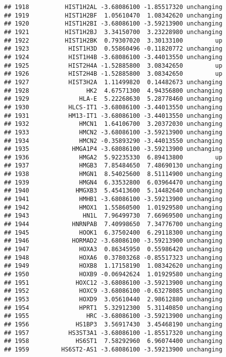 \documentclass[]{article}
\begin{document}
\begin{verbatim}
## 1918          HIST1H2AL -3.68086100 -1.85517320 unchanging
## 1919          HIST1H2BF  1.05610470  1.08342620 unchanging
## 1920          HIST1H2BI -3.68086100 -3.59213900 unchanging
## 1921          HIST1H2BJ  3.34150700  3.23228980 unchanging
## 1922          HIST1H2BK  0.79307020  3.30133100         up
## 1923           HIST1H3D  0.55860496 -0.11820772 unchanging
## 1924           HIST1H4B -3.68086100 -3.44013550 unchanging
## 1925           HIST2H4A -1.52885800  3.08342650         up
## 1926           HIST2H4B -1.52885800  3.08342650         up
## 1927           HIST3H2A  1.11499820  0.14482673 unchanging
## 1928                HK2  4.67571300  4.94356800 unchanging
## 1929              HLA-E  5.22268630  5.28778460 unchanging
## 1930           HLCS-IT1 -3.68086100 -3.44013550 unchanging
## 1931           HM13-IT1 -3.68086100 -3.44013550 unchanging
## 1932              HMCN1  1.64106700  3.20372030 unchanging
## 1933              HMCN2 -3.68086100 -3.59213900 unchanging
## 1934              HMCN2 -0.35893290 -3.44013550 unchanging
## 1935            HMGA1P4 -3.68086100 -3.59213900 unchanging
## 1936              HMGA2  5.92235330  6.89413800         up
## 1937              HMGB3  7.85484650  7.48690130 unchanging
## 1938              HMGN1  8.54025600  8.51114900 unchanging
## 1939              HMGN4  6.33532800  6.03964470 unchanging
## 1940             HMGXB3  5.45413600  5.14482640 unchanging
## 1941              HMHB1 -3.68086100 -3.59213900 unchanging
## 1942              HMOX1  1.55860500  1.01929580 unchanging
## 1943               HN1L  7.96499730  7.66969500 unchanging
## 1944            HNRNPAB  7.40998650  7.34776700 unchanging
## 1945              HOOK1  6.37502400  6.29118300 unchanging
## 1946            HORMAD2 -3.68086100 -3.59213900 unchanging
## 1947              HOXA3  0.86345950  0.55986420 unchanging
## 1948              HOXA6  0.37803268 -0.85517323 unchanging
## 1949              HOXB8  1.17158190  1.08342620 unchanging
## 1950              HOXB9 -0.06942624  1.01929580 unchanging
## 1951             HOXC12 -3.68086100 -3.59213900 unchanging
## 1952              HOXC9 -3.68086100 -0.63278085 unchanging
## 1953              HOXD9  3.05610440  2.98612880 unchanging
## 1954              HPRT1  5.32912300  5.31140850 unchanging
## 1955                HRC -3.68086100 -3.59213900 unchanging
## 1956             HS1BP3  3.56917430  3.45468190 unchanging
## 1957           HS3ST3A1 -3.68086100 -1.85517320 unchanging
## 1958             HS6ST1  7.58292960  6.96074400 unchanging
## 1959         HS6ST2-AS1 -3.68086100 -3.59213900 unchanging

\end{verbatim}
\end{document}
